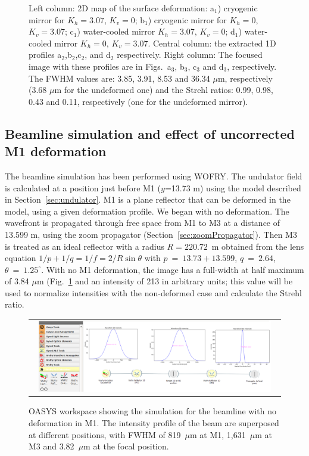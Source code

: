 \documentclass[preprint]{iucr}
\begin{document}
\begin{figure}
\begin{center}
\begin{tabular}{l}
   \end{tabular}
  \end{center}
   \caption
   { 
   Left column: 2D map of the surface deformation: a$_1$) cryogenic mirror for $K_h=3.07$, $K_v=0$; b$_1$) cryogenic mirror for $K_h=0$, $K_v=3.07$; c$_1$) water-cooled mirror $K_h=3.07$, $K_v=0$; d$_1$) water-cooled mirror $K_h=0$, $K_v=3.07$. Central column: the extracted 1D profiles a$_2$,b$_2$,c$_2$, and d$_2$ respectively. Right column: The focused image with these profiles are in Figs.~a$_3$, b$_3$, c$_3$ and d$_3$, respectively. 
   The FWHM values are: 3.85, 3.91, 8.53 and 36.34 $\mu$m, respectively (3.68 $\mu$m for the undeformed one) and the Strehl ratios: 0.99, 0.98, 0.43 and 0.11, respectively (one for the undeformed mirror).
   }
   \end{figure} 


\subsection{Beamline simulation and effect of uncorrected M1 deformation}

The beamline simulation has been performed using WOFRY. The undulator field is calculated at a position just before M1 ($y$=13.73 m) using the model described in Section~\ref{sec:undulator}. M1 is a plane reflector that can be deformed in the model, using a given deformation profile. We began with no deformation. The wavefront is propagated through free space from M1 to M3 at a distance of 13.599 m, using the zoom propagator (Section~\ref{sec:zoomPropagator}). Then M3 is treated as an ideal reflector with a radius $R=220.72$~m obtained from the lens equation $1/p + 1/q=1/f=2/R \sin \theta$ with $p~=~13.73+13.599$, $q~=~2.64$, $\theta~=~1.25^\circ$. With no M1 deformation, the image has a full-width at half maximum of 3.84 $\mu$m (Fig.~\ref{fig:nodeformation} and an intensity of 213 in arbitrary units; this value will be used to normalize intensities with the non-deformed case and calculate the Strehl ratio.

\begin{figure} 
\label{fig:nodeformation} 
\begin{center}
\begin{tabular}{c} 
\includegraphics[width=0.95\textwidth]{figures/wofrynodeformation.png}
\end{tabular}
\end{center}
\caption{ 
OASYS workspace showing the simulation for the beamline with no deformation in M1. The intensity profile of the beam are superposed at different positions, with FWHM of 819~$\mu$m at M1, 1,631~$\mu$m at M3 and 3.82~$\mu$m at the focal position.  }
\end{figure} 
\end{document}
